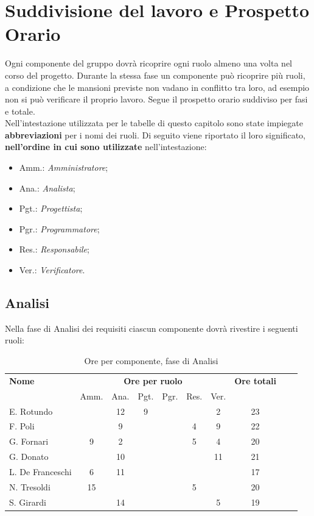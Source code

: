 \section{Suddivisione del lavoro e Prospetto Orario} 


Ogni componente del gruppo dovrà ricoprire ogni ruolo almeno una volta nel corso del progetto.
Durante la stessa fase un componente può ricoprire più ruoli, a condizione che le mansioni previste non vadano in conflitto tra loro, ad esempio non si può verificare il proprio lavoro.
Segue il prospetto orario suddiviso per fasi e totale. \\

Nell'intestazione utilizzata per le tabelle di questo capitolo sono state impiegate \textbf{abbreviazioni} per i nomi dei ruoli.
Di seguito viene riportato il loro significato, \textbf{nell'ordine in cui sono utilizzate} nell'intestazione:
\begin{itemize}
\item Amm.: \textit{Amministratore};
\item Ana.: \textit{Analista};
\item Pgt.: \textit{Progettista};
\item Pgr.: \textit{Programmatore};
\item Res.: \textit{Responsabile};
\item Ver.: \textit{Verificatore}.
\end{itemize}

\pagebreak
\subsection{Analisi}

Nella fase di Analisi dei requisiti ciascun componente dovrà rivestire i seguenti ruoli:
\noindent
\begin{table}[H]
\begin{tabular}{lccccccccc}
\toprule
    \textbf{Nome}  & \multicolumn{6}{c}{\textbf{Ore per ruolo}} & \textbf{Ore totali} \\
     & Amm. & Ana. & Pgt. & Pgr. & Res. & Ver. \\
    \midrule
    
    E. Rotundo 		&   & 12 & 9 &  &  & 2 & 23 \\
    F. Poli 		&   & 9 &  &  & 4 & 9 & 22 \\
    G. Fornari		& 9 & 2 & 	&  & 5 & 4 & 20 \\
    G. Donato 		&   & 10 &  &  &  & 11 & 21 \\
    L. De Franceschi  & 6 & 11 &  &  &  &  & 17 \\
    N. Tresoldi 		& 15&  &  &  & 5 &  & 20 \\
   	S. Girardi 		&   & 14 &  &  &  & 5 & 19 \\
    
    \bottomrule
\end{tabular}
\caption{Ore per componente, fase di Analisi}
\end{table}

